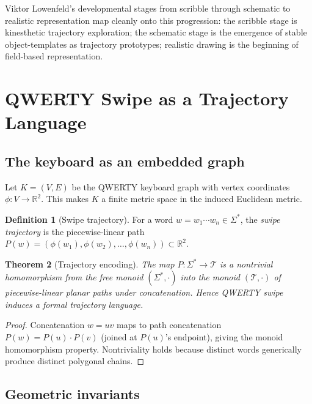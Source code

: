 \documentclass[12pt,a4paper]{article}
\theoremstyle{plain}
\newtheorem{theorem}{Theorem}[section]
\theoremstyle{definition}
\newtheorem{definition}[theorem]{Definition}
\begin{document}
Viktor Lowenfeld's developmental stages from scribble through schematic to
realistic representation \cite{lowenfeld1947} map cleanly onto this progression:
the scribble stage is kinesthetic trajectory exploration; the schematic stage is
the emergence of stable object-templates as trajectory prototypes; realistic
drawing is the beginning of field-based representation.

\section{QWERTY Swipe as a Trajectory Language}
\label{sec:swipe}

\subsection{The keyboard as an embedded graph}

Let $K=(V,E)$ be the QWERTY keyboard graph with vertex coordinates
$\phi:V\to\mathbb{R}^2$. This makes $K$ a finite metric space in the induced
Euclidean metric.

\begin{definition}[Swipe trajectory]
For a word $w=w_1\cdots w_n\in\Sigma^*$, the \emph{swipe trajectory} is the
piecewise-linear path
$P(w)=(\phi(w_1),\phi(w_2),\dots,\phi(w_n))\subset\mathbb{R}^2$.
\end{definition}

\begin{theorem}[Trajectory encoding]
\label{thm:swipe}
The map $P:\Sigma^*\to\mathcal{T}$ is a nontrivial homomorphism from the free
monoid $(\Sigma^*,\cdot)$ into the monoid $(\mathcal{T},\cdot)$ of piecewise-linear
planar paths under concatenation. Hence QWERTY swipe induces a formal trajectory
language.
\end{theorem}

\begin{proof}
Concatenation $w=uv$ maps to path concatenation $P(w)=P(u)\cdot P(v)$
(joined at $P(u)$'s endpoint), giving the monoid homomorphism property.
Nontriviality holds because distinct words generically produce distinct
polygonal chains.
\end{proof}

\subsection{Geometric invariants}
\end{document}
